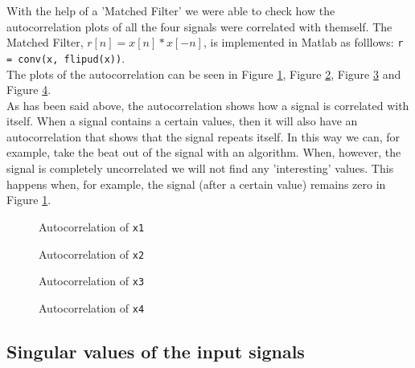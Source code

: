 \documentclass[final]{scrreprt} %
\begin{document}
With the help of a 'Matched Filter' we were able to check how the autocorrelation plots of all the four signals were correlated with themself.
The Matched Filter, $r[n]=x[n]*x[-n]$, is implemented in Matlab as folllows: \texttt{r = conv(x, flipud(x))}.
\\
The plots of the autocorrelation can be seen in Figure \ref{fig:auto1}, Figure \ref{fig:auto2}, Figure \ref{fig:auto3} and Figure \ref{fig:auto4}.
\\
As has been said above, the autocorrelation shows how a signal is correlated with itself. 
When a signal contains a certain values, then it will also have an autocorrelation that shows that the signal repeats itself.
In this way we can, for example, take the beat out of the signal with an algorithm.
When, however, the signal is completely uncorrelated we will not find any 'interesting' values.
This happens when, for example, the signal (after a certain value) remains zero in Figure \ref{fig:auto1}.


\begin{figure}[H]
	\centering
    	\setlength\figureheight{6cm}
    	\setlength\figurewidth{10cm}
    	    	
    	\caption{Autocorrelation of \texttt{x1}}
    	\label{fig:auto1}
\end{figure}
\begin{figure}[H]
	\centering
    	\setlength\figureheight{6cm}
    	\setlength\figurewidth{10cm}
    	    	
    	\caption{Autocorrelation of \texttt{x2}}
    	\label{fig:auto2}
\end{figure}
\begin{figure}[H]
	\centering
    	\setlength\figureheight{6cm}
    	\setlength\figurewidth{10cm}
    	    	
    	\caption{Autocorrelation of \texttt{x3}}
    	\label{fig:auto3}
\end{figure}
\begin{figure}[H]
	\centering
    	\setlength\figureheight{6cm}
    	\setlength\figurewidth{10cm}
    	    	
    	\caption{Autocorrelation of \texttt{x4}}
    	\label{fig:auto4}
\end{figure}

\subsection{Singular values of the input signals}
\end{document}
